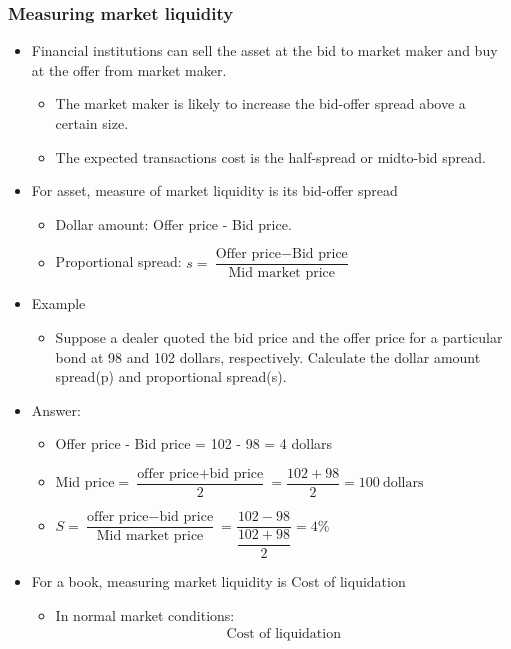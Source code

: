 \subsubsection{Measuring market liquidity}
\begin{itemize}
\item Financial institutions can sell the asset at the bid to market maker and buy at the offer from market maker.
    \begin{itemize}
    \item The market maker is likely to increase the bid-offer spread above a certain size.
    \item The expected transactions cost is the half-spread or midto-bid spread.
    \end{itemize}
\item For asset, measure of market liquidity is its bid-offer spread
    \begin{itemize}
    \item Dollar amount: Offer price - Bid price.
    \item Proportional spread: $s = \dfrac{\text{Offer price} - \text{Bid price}}{\text{Mid market price}}$
    \end{itemize}
\item Example
    \begin{itemize}
    \item Suppose a dealer quoted the bid price and the offer price for a particular bond at 98 and 102 dollars, respectively. Calculate the dollar amount spread(p) and proportional spread(s).
    \end{itemize}
\item Answer:
    \begin{itemize}
    \item Offer price - Bid price = 102 - 98 = 4 dollars
    \item $ \text{Mid price} = \dfrac{\text{offer price} + \text{bid price}}{2} = \dfrac{102 + 98}{2} = 100\ \text{dollars} $
    \item $ S = \dfrac{\text{offer price} - \text{bid price}}{\text{Mid market price}}
= \dfrac{102 - 98}{\dfrac{102 + 98}{2}} = 4\% $
    \end{itemize}
\item For a book, measuring market liquidity is Cost of liquidation
    \begin{itemize}
    \item In normal market conditions:
        \begin{align*}
            \text{Cost of liquidation} 

\end{align*}
\end{itemize}
\end{itemize}

